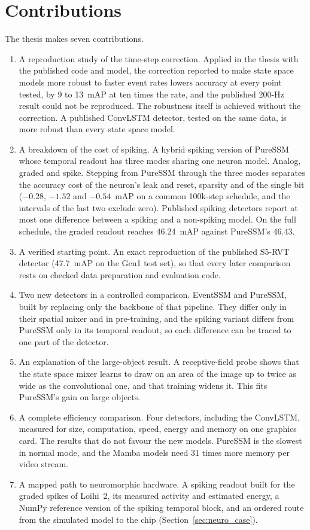 \documentclass[11pt, a4paper]{report}
\begin{document}
\section{Contributions}
\label{sec:contributions}
The thesis makes seven contributions.
\begin{enumerate}
      \item A reproduction study of the time-step correction. Applied in the thesis with the published code and model, the
        correction reported to make state space models more robust to faster event rates lowers accuracy at every
        point tested, by 9 to 13~mAP at ten times the rate, and the published 200-Hz result could not be
        reproduced. The robustness itself is achieved without the correction. A published ConvLSTM
        detector, tested on the same data, is more robust than every state space model.
\item A breakdown of the cost of spiking. A hybrid spiking version of PureSSM whose temporal
        readout has three modes sharing one neuron model. Analog, graded and spike. Stepping from PureSSM
        through the three modes separates the accuracy cost of the neuron's leak and reset, sparsity and of the single bit ($-0.28$, $-1.52$ and $-0.54$~mAP on a common 100k-step schedule, and the intervals
        of the last two exclude zero). Published spiking detectors report at most one difference between a
        spiking and a non-spiking model. On the full schedule, the graded readout reaches 46.24~mAP against
        PureSSM's 46.43.
  \item A verified starting point. An exact reproduction of the published S5-RVT detector
        (47.7~mAP on the Gen1 test set), so that every later comparison rests on checked data preparation
        and evaluation code.
  \item Two new detectors in a controlled comparison. EventSSM and PureSSM, built by replacing only
        the backbone of that pipeline. They differ only in their spatial mixer and in pre-training, and the
        spiking variant differs from PureSSM only in its temporal readout, so each difference can be traced
        to one part of the detector.
  \item An explanation of the large-object result. A receptive-field probe shows that the state
        space mixer learns to draw on an area of the image up to twice as wide as the convolutional one, and
        that training widens it. This fits PureSSM's gain on large objects.
  \item A complete efficiency comparison. Four detectors, including the ConvLSTM, measured for size,
        computation, speed, energy and memory on one graphics card. The results that do not favour the new
        models. PureSSM is the slowest in normal mode, and the Mamba models need 31 times
        more memory per video stream.
  \item A mapped path to neuromorphic hardware. A spiking readout built for the graded spikes of
        Loihi~2, its measured activity and estimated energy, a NumPy reference version of the spiking
        temporal block, and an ordered route from the simulated model to the chip
        (Section~\ref{sec:neuro_case}).
\end{enumerate}
\end{document}
